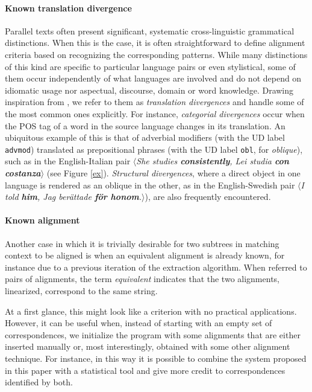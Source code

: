 \documentclass[11pt]{article}
\begin{document}
\paragraph{Known translation divergence}
Parallel texts often present significant, systematic cross-linguistic grammatical distinctions. 
When this is the case, it is often straightforward to define alignment criteria based on recognizing the corresponding patterns.
While many distinctions of this kind are specific to particular language pairs or even stylistical, some of them occur independently of what languages are involved and do not depend on idiomatic usage nor aspectual, discourse, domain or word knowledge.   
Drawing inspiration from \cite{dorr-1994-machine}, we refer to them as \textit{translation divergences} and handle some of the most common ones explicitly. 
For instance, \textit{categorial divergences} occur when the POS tag of a word in the source language changes in its translation.
An ubiquitous example of this is that of adverbial modifiers (with the UD label \texttt{advmod}) translated as prepositional phrases (with the UD label \texttt{obl}, for \textit{oblique}), such as in the English-Italian pair $\langle$\textit{She studies \textbf{consistently}, Lei studia \textbf{con costanza}}$\rangle$ (see Figure \ref{ex}).
\textit{Structural divergences}, where a direct object in one language is rendered as an oblique in the other, as in the English-Swedish pair $\langle$\textit{I told \textbf{him}, Jag berättade \textbf{för honom}.}$\rangle$), are also frequently encountered.

\paragraph{Known alignment} \label{ka}
Another case in which it is trivially desirable for two subtrees in matching context to be aligned is when an equivalent alignment is already known, for instance due to a previous iteration of the extraction algorithm. 
When referred to pairs of alignments, the term \textit{equivalent} indicates that the two alignments, linearized, correspond to the same string.

At a first glance, this might look like a criterion with no practical applications. 
However, it can be useful when, instead of starting with an empty set of correspondences, we initialize the program with some alignments that are either inserted manually or, most interestingly, obtained with some other alignment technique. 
For instance, in this way it is possible to combine the system proposed in this paper with a statistical tool and give more credit to correspondences identified by both.
\end{document}
